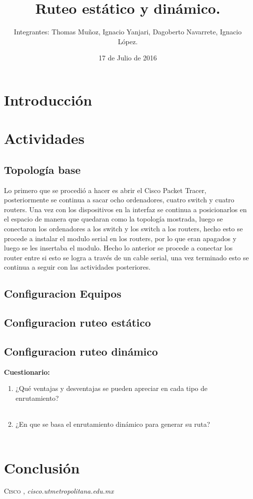 \documentclass{udpreport}
\title{Ruteo estático y dinámico. }
\author{Integrantes: Thomas Muñoz, Ignacio Yanjari, Dagoberto Navarrete, Ignacio López.}
\date{17 de Julio de 2016}
\begin{document}
\maketitle
\tableofcontents
\listoffigures
\chapter{Introducción}
  
\chapter{Actividades}
	\section{Topología base}
	Lo primero que se procedió a hacer es abrir el Cisco Packet Tracer, posteriormente se continua a sacar ocho ordenadores,
	cuatro switch y cuatro routers. Una vez con los dispositivos en la interfaz se continua a posicionarlos en el espacio de
	manera que quedaran como la topología mostrada, luego se conectaron los ordenadores a los switch y los switch a los
	routers, hecho esto se procede a instalar el modulo serial en los routers, por lo que eran apagados y luego se les insertaba
	el modulo. Hecho lo anterior se procede a conectar los router entre si esto se logra a través de un cable serial, una vez
	terminado esto se continua a seguir con las actividades posteriores.\\
	\section{Configuracion Equipos}
	\section{Configuracion ruteo estático}
	\section{Configuracion ruteo dinámico}
{\large \bf{Cuestionario: }}\\
	\begin{enumerate}
	    \item ¿Qué ventajas y desventajas se pueden apreciar en cada tipo de enrutamiento?\\\\
            \item ¿En que se basa el enrutamiento dinámico para generar su ruta?\\\\
 
  	     
	\end{enumerate}
	
    
	
\chapter{Conclusión}
 
\begin{thebibliography}{x}
 \textsc{Cisco },
\textit{cisco.utmetropolitana.edu.mx}


\end{thebibliography}
\end{document}
